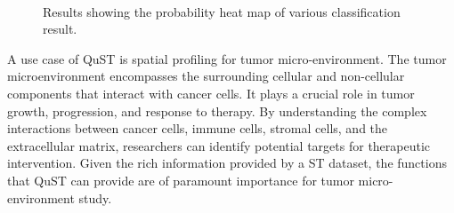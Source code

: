 \documentclass{article}
\begin{document}
\begin{figure}[htp]
	\hfill
	\hfill
	\\	
	\caption{Results showing the probability heat map of various classification result.}
	\label{fig:result2}
\end{figure}

A use case of QuST is spatial profiling for tumor micro-environment. The tumor microenvironment encompasses the surrounding cellular and non-cellular components that interact with cancer cells. It plays a crucial role in tumor growth, progression, and response to therapy. By understanding the complex interactions between cancer cells, immune cells, stromal cells, and the extracellular matrix, researchers can identify potential targets for therapeutic intervention. Given the rich information provided by a ST dataset, the functions that QuST can provide are of paramount importance for tumor micro-environment study.
\end{document}
